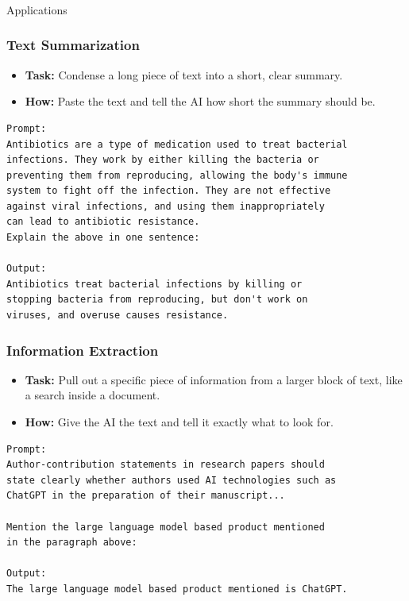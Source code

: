 \begin{frame}[fragile]\frametitle{}
\begin{center}
{\Large Applications}
\end{center}
\end{frame}

\begin{frame}[fragile]\frametitle{Text Summarization}
\begin{itemize}
    \item \textbf{Task:} Condense a long piece of text into a short, clear summary.
    \item \textbf{How:} Paste the text and tell the AI how short the summary should be.
\end{itemize}
\begin{lstlisting}[language=HTML]
Prompt:
Antibiotics are a type of medication used to treat bacterial 
infections. They work by either killing the bacteria or 
preventing them from reproducing, allowing the body's immune 
system to fight off the infection. They are not effective 
against viral infections, and using them inappropriately 
can lead to antibiotic resistance.
Explain the above in one sentence:

Output:
Antibiotics treat bacterial infections by killing or 
stopping bacteria from reproducing, but don't work on 
viruses, and overuse causes resistance.
\end{lstlisting}
\end{frame}

\begin{frame}[fragile]\frametitle{Information Extraction}
\begin{itemize}
    \item \textbf{Task:} Pull out a specific piece of information from a larger block of text, like a search inside a document.
    \item \textbf{How:} Give the AI the text and tell it exactly what to look for.
\end{itemize}
\begin{lstlisting}[language=HTML]
Prompt:
Author-contribution statements in research papers should 
state clearly whether authors used AI technologies such as 
ChatGPT in the preparation of their manuscript...

Mention the large language model based product mentioned 
in the paragraph above:

Output:
The large language model based product mentioned is ChatGPT.
\end{lstlisting}
\end{frame}

